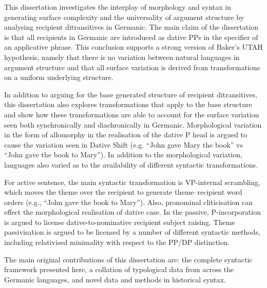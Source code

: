 \singlespacing
This dissertation investigates the interplay of morphology and syntax in generating surface complexity and the universality of argument structure by analysing recipient ditransitives in Germanic. The main claim of the dissertation is that all recipients in Germanic are introduced as dative PPs in the specifier of an applicative phrase. This conclusion supports a strong version of Baker's UTAH hypothesis, namely that there is no variation between natural languages in argument structure and that all surface variation is derived from transformations on a uniform underlying structure.

In addition to arguing for the base generated structure of recipient ditransitives, this dissertation also explores transformations that apply to the base structure and show how these transformations are able to account for the surface variation seen both synchronically and diachronically in Germanic. Morphological variation in the form of allomorphy in the realisation of the dative P head is argued to cause the variation seen in Dative Shift (e.g. ``John gave Mary the book'' vs ``John gave the book to Mary''). In addition to the morphological variation, languages also varied as to the availability of different syntactic transformations.

For active sentence, the main syntactic transformation is VP-internal scrambling, which moves the theme over the recipient to generate theme--recipient word orders (e.g., ``John gave the book to Mary''). Also, pronominal cliticisation can effect the morphological realisation of dative case. In the passive, P-incorporation is argued to license dative-to-nominative recipient subject raising. Theme passivisation is argued to be licensed by a number of different syntactic methods, including relativised minimality with respect to the PP/DP distinction.

The main original contributions of this dissertation are: the complete syntactic framework presented here, a collation of typological data from across the Germanic languages, and novel data and methods in historical syntax.

\doublespacing
